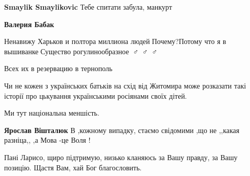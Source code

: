 \begin{itemize}
\begin{itemize}
\begin{itemize}
\textbf{Smaylik Smaylikovic} Тебе спитати забула, манкурт

 
\textbf{Валерия Бабак} 

Ненавижу Харьков и полтора миллиона людей🤣Почему?Потому что я в
вышиванке🤣Существо рогулинообразное🤦🏻♂️🤦🏻♂️🤦🏻♂️

\end{itemize}

 
Всех их в резервацию в тернополь

\end{itemize}

 

Чи не кожен з українських батьків на схід від Житомира може розказати такі
історії про цькування українськими росіянами своїх дітей.

Ми тут національна меншість.

\begin{itemize}
 
\textbf{Ярослав Вішталюк} В ,кожному випадку, стаємо свідомими ,що не ,,какая разніца,, ,а Мова -це Воля !
\end{itemize}


 
Пані Ларисо, щиро підтримую, низько кланяюсь за Вашу правду, за Вашу позицію. Щастя Вам, хай Бог благословить.


\end{itemize}
